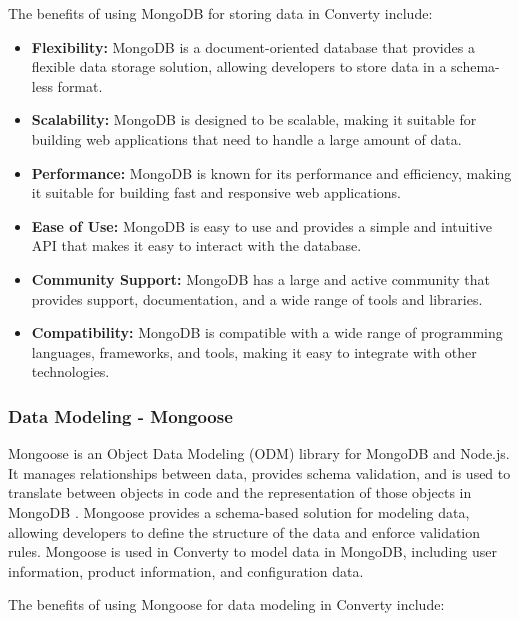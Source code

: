The benefits of using MongoDB for storing data in Converty include:

\begin{itemize}
    \item \textbf{Flexibility:} MongoDB is a document-oriented database that provides a flexible data storage solution, allowing developers to store data in a schema-less format.
    \item \textbf{Scalability:} MongoDB is designed to be scalable, making it suitable for building web applications that need to handle a large amount of data.
    \item \textbf{Performance:} MongoDB is known for its performance and efficiency, making it suitable for building fast and responsive web applications.
    \item \textbf{Ease of Use:} MongoDB is easy to use and provides a simple and intuitive API that makes it easy to interact with the database.
    \item \textbf{Community Support:} MongoDB has a large and active community that provides support, documentation, and a wide range of tools and libraries.
    \item \textbf{Compatibility:} MongoDB is compatible with a wide range of programming languages, frameworks, and tools, making it easy to integrate with other technologies.
\end{itemize}

\subsubsection{Data Modeling - Mongoose}
Mongoose is an Object Data Modeling (ODM) library for MongoDB and Node.js. It manages relationships between data, provides schema validation, and is used to translate between objects in code and the representation of those objects in MongoDB \cite{mongoose}. Mongoose provides a schema-based solution for modeling data, allowing developers to define the structure of the data and enforce validation rules. Mongoose is used in Converty to model data in MongoDB, including user information, product information, and configuration data.

The benefits of using Mongoose for data modeling in Converty include:

